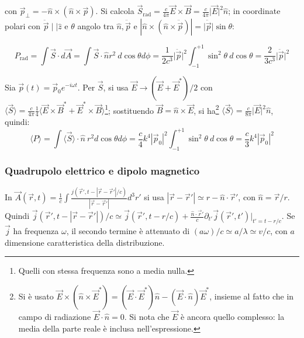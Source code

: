 \documentclass[10pt, a4paper]{scrartcl}
\numberwithin{equation}{subsection}
\theoremstyle{style1}
\newenvironment{boxenv}[1][]{
    \begin{eqbox}[#1]
    }{
   \end{eqbox}
}
\begin{document}
\noindent con $\vec{p}_\perp = - \hat{n}\times (\hat{n}\times \vec{p})$. Si calcola $\vec{S}_\text{rad} = \frac{c}{4\pi} \vec{E}\times \vec{B}= \frac{c}{4\pi}\lvert \vec{E} \rvert ^2 \hat{n}$; in coordinate polari con $\ddot{\vec{p}} \mid  \mid  \hat{z}$ e $\theta$ angolo tra $\hat{n},\ddot{\vec{p}}$ e $|\hat{n}\times (\hat{n}\times \ddot{\vec{p}})|=\lvert \ddot{\vec{p}} \rvert \sin \theta $:
\begin{boxenv}[]
\begin{equation}
	P_\text{rad} = \int \vec{S}\cdot d\vec{A}= \int \vec{S}\cdot \hat{n} r^2 \ d\cos \theta d \phi = \frac{1}{2c^3} \lvert \ddot{\vec{p} }\rvert ^2 \int_{-1} ^{+1} \sin^2 \theta \ d\cos \theta  = \frac{2}{3c^3}\lvert \ddot{\vec{p}} \rvert ^2
\end{equation}
\end{boxenv}
\noindent Sia $\vec{p}(t) = \vec{p}_0 e^{-i\omega t} $. Per $\vec{S}$, si usa $\vec{E}\to (\vec{E}+\vec{E}^*) / 2$ con $\langle\vec{S}\rangle = \frac{c}{4\pi} \frac{1}{4} \langle\vec{E}\times \vec{B}^* + \vec{E}^* \times \vec{B}\rangle$\footnote{Quelli con stessa frequenza sono a media nulla.}; sostituendo $\vec{B}= \hat{n}\times \vec{E}$, si ha\footnote{Si \`e usato $\vec{E} \times (\hat{n} \times \vec{E}^*) = (\vec{E} \cdot \vec{E}^*) \hat{n} - (\vec{E} \cdot \hat{n}) \vec{E}^*$, insieme al fatto che in campo di radiazione $\vec{E}\cdot \hat{n}=0$. Si nota che $\vec{E}$ \`e ancora quello complesso: la media della parte reale \`e inclusa nell'espressione.} $\langle \vec{S} \rangle=\frac{c}{8\pi} \lvert \vec{E} \rvert ^2 \hat{n}$, quindi:
\begin{equation}
	\langle P\rangle= \int \langle \vec{S}\rangle\cdot \hat{n}\ r^2 d\cos\theta  d\phi = \frac{c}{4}k^4 \left\lvert \vec{p}_0 \right\rvert ^2 \int_{-1}^{+1} \sin^2 \theta\ d \cos\theta = \frac{c}{3} k^4 \left\lvert \vec{p}_0 \right\rvert ^2
\end{equation}

\subsubsection{Quadrupolo elettrico e dipolo magnetico}

In $\vec{A}(\vec{r},t) = \frac{1}{c}\int \frac{j(\vec{r}', t - \left\lvert \vec{r}-\vec{r}' \right\rvert / c)}{\left\lvert \vec{r}-\vec{r}' \right\rvert } d^3 r'$ si usa $\left\lvert \vec{r}-\vec{r}' \right\rvert \simeq r - \hat{n}\cdot \vec{r}'$, con $\hat{n}= \vec{r}/r$. Quindi $\vec{j}(\vec{r}' , t - \left\lvert \vec{r}- \vec{r}'\right\rvert) /c\simeq \vec{j}(\vec{r}', t - r / c)+\frac{\hat{n}\cdot \vec{r}'}{c}\partial _{t'}  \vec{j}(\vec{r}', t') | _{t' = t- r / c} $. Se $\vec{j}$ ha frequenza $\omega$, il secondo termine \`e attenuato di $(a\omega)/c\simeq a / \lambda \simeq v / c$, con $a$ dimensione caratteristica della distribuzione.
\end{document}
